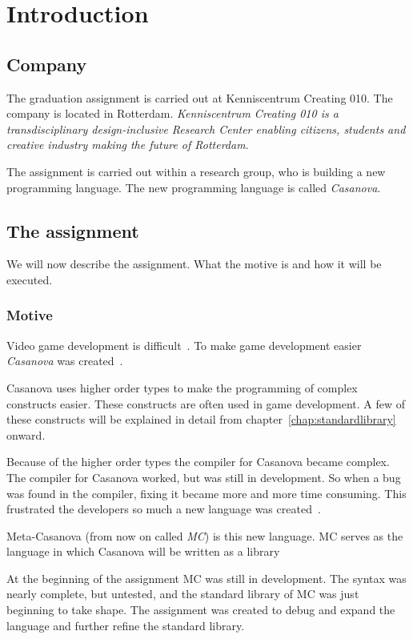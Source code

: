 \chapter{Introduction}
\section{Company}
The graduation assignment is carried out at Kenniscentrum Creating 010.
The company is located in Rotterdam.
\textit{Kenniscentrum Creating 010 is a transdisciplinary design-inclusive Research Center enabling citizens, students and creative industry making the future of Rotterdam}\cite{creating2016home}.

The assignment is carried out within a research group, who is building a new programming language.
The new programming language is called \emph{Casanova}.


\section{The assignment}
We will now describe the assignment.
What the motive is and how it will be executed.

\subsection{Motive}
Video game development is difficult~\cite{blow2004game}.
To make game development easier \emph{Casanova} was created~\cite{maggiore2011designing}.

Casanova uses higher order types to make the programming of complex constructs easier.
These constructs are often used in game development.
A few of these constructs will be explained in detail from chapter~\ref{chap:standardlibrary} onward.

Because of the higher order types the compiler for Casanova became complex.
The compiler for Casanova worked, but was still in development.
So when a bug was found in the compiler, fixing it became more and more time consuming.
This frustrated the developers so much a new language was created~\cite{giuseppe2015mc}.

Meta-Casanova (from now on called \emph{MC}) is this new language.
MC serves as the language in which Casanova will be written as a library

At the beginning of the assignment MC was still in development.
The syntax was nearly complete, but untested, and the standard library of MC was just beginning to take shape.
The assignment was created to debug and expand the language and further refine the standard library.


